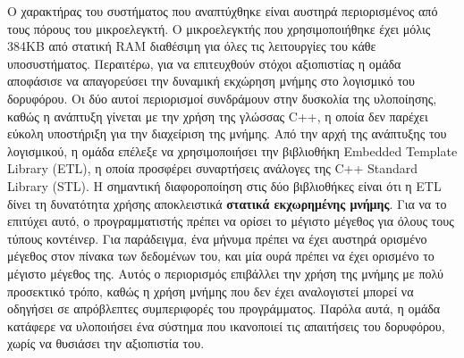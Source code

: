 \documentclass[a4paper,nobib,justified]{tufte-book}
\begin{document}

\clearpage


Ο χαρακτήρας του συστήματος που αναπτύχθηκε είναι αυστηρά περιορισμένος από τους πόρους του μικροελεγκτή. Ο μικροελεγκτής που χρησιμοποιήθηκε έχει μόλις 384KB από στατική RAM διαθέσιμη για όλες τις λειτουργίες του κάθε υποσυστήματος. Περαιτέρω, για να επιτευχθούν στόχοι αξιοπιστίας η ομάδα αποφάσισε να απαγορεύσει την δυναμική εκχώρηση μνήμης στο λογισμικό του δορυφόρου. Οι δύο αυτοί περιορισμοί συνδράμουν στην δυσκολία της υλοποίησης, καθώς η ανάπτυξη γίνεται με την χρήση της γλώσσας C++, η οποία δεν παρέχει εύκολη υποστήριξη για την διαχείριση της μνήμης. Από την αρχή της ανάπτυξης του λογισμικού, η ομάδα επέλεξε να χρησιμοποιήσει την βιβλιοθήκη Embedded Template Library (ETL), η οποία προσφέρει συναρτήσεις ανάλογες της C++ Standard Library (STL). Η σημαντική διαφοροποίηση στις δύο βιβλιοθήκες είναι ότι η ETL δίνει τη δυνατότητα χρήσης αποκλειστικά \textbf{στατικά εκχωρημένης μνήμης}. Για να το επιτύχει αυτό, ο προγραμματιστής πρέπει να ορίσει το μέγιστο μέγεθος για όλους τους τύπους κοντέινερ. Για παράδειγμα, ένα μήνυμα πρέπει να έχει αυστηρά ορισμένο μέγεθος στον πίνακα των δεδομένων του, και μία ουρά πρέπει να έχει ορισμένο το μέγιστο μέγεθος της. Αυτός ο περιορισμός επιβάλλει την χρήση της μνήμης με πολύ προσεκτικό τρόπο, καθώς η χρήση μνήμης που δεν έχει αναλογιστεί μπορεί να οδηγήσει σε απρόβλεπτες συμπεριφορές του προγράμματος. Παρόλα αυτά, η ομάδα κατάφερε να υλοποιήσει ένα σύστημα που ικανοποιεί τις απαιτήσεις του δορυφόρου, χωρίς να θυσιάσει την αξιοπιστία του.
\end{document}

